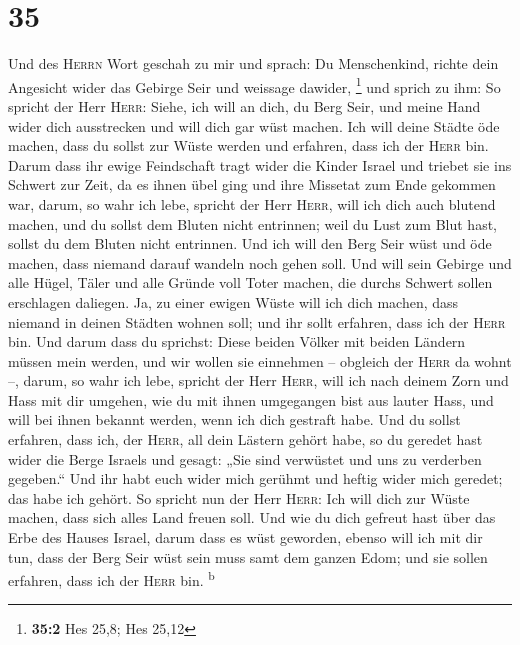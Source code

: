 \hypertarget{section-34}{%
\section{35}\label{section-34}}

 Und des \textsc{Herrn} Wort geschah zu mir und sprach:
 Du Menschenkind, richte dein Angesicht wider das Gebirge
Seir und weissage dawider, \footnote{\textbf{35:2} Hes 25,8; Hes 25,12}
 und sprich zu ihm: So spricht der Herr \textsc{Herr}:
Siehe, ich will an dich, du Berg Seir, und meine Hand wider dich
ausstrecken und will dich gar wüst machen.  Ich will deine
Städte öde machen, dass du sollst zur Wüste werden und erfahren, dass
ich der \textsc{Herr} bin.  Darum dass ihr ewige
Feindschaft tragt wider die Kinder Israel und triebet sie ins Schwert
zur Zeit, da es ihnen übel ging und ihre Missetat zum Ende gekommen war,
 darum, so wahr ich lebe, spricht der Herr \textsc{Herr},
will ich dich auch blutend machen, und du sollst dem Bluten nicht
entrinnen; weil du Lust zum Blut hast, sollst du dem Bluten nicht
entrinnen.  Und ich will den Berg Seir wüst und öde
machen, dass niemand darauf wandeln noch gehen soll.  Und
will sein Gebirge und alle Hügel, Täler und alle Gründe voll Toter
machen, die durchs Schwert sollen erschlagen daliegen. 
Ja, zu einer ewigen Wüste will ich dich machen, dass niemand in deinen
Städten wohnen soll; und ihr sollt erfahren, dass ich der \textsc{Herr}
bin.  Und darum dass du sprichst: Diese beiden Völker mit
beiden Ländern müssen mein werden, und wir wollen sie einnehmen --
obgleich der \textsc{Herr} da wohnt --,  darum, so wahr
ich lebe, spricht der Herr \textsc{Herr}, will ich nach deinem Zorn und
Hass mit dir umgehen, wie du mit ihnen umgegangen bist aus lauter Hass,
und will bei ihnen bekannt werden, wenn ich dich gestraft habe.
 Und du sollst erfahren, dass ich, der \textsc{Herr}, all
dein Lästern gehört habe, so du geredet hast wider die Berge Israels und
gesagt: „Sie sind verwüstet und uns zu verderben gegeben.``
 Und ihr habt euch wider mich gerühmt und heftig wider
mich geredet; das habe ich gehört.  So spricht nun der
Herr \textsc{Herr}: Ich will dich zur Wüste machen, dass sich alles Land
freuen soll.  Und wie du dich gefreut hast über das Erbe
des Hauses Israel, darum dass es wüst geworden, ebenso will ich mit dir
tun, dass der Berg Seir wüst sein muss samt dem ganzen Edom; und sie
sollen erfahren, dass ich der \textsc{Herr} bin. \textsuperscript{b}


